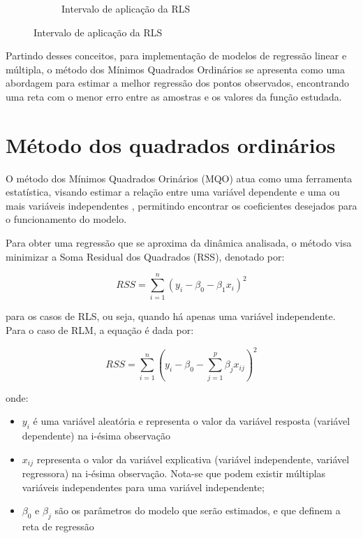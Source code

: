 \begin{figure}[H]
\begin{subfigure}{0.4\textwidth}
		\caption{Intervalo de aplicação da RLS}
		\label{fig:intervalo_aplicacao_rls}
	\end{subfigure}
	\label{fig:comportamento_regressao_linear}
\end{figure}

Partindo desses conceitos, para implementação de modelos de regressão linear e múltipla, o método dos Mínimos Quadrados Ordinários se apresenta como uma abordagem para estimar a melhor regressão dos pontos observados, encontrando uma reta com o menor erro entre as amostras e os valores da função estudada.

\section{Método dos quadrados ordinários}

O método dos Mínimos Quadrados Orinários (MQO) atua como uma ferramenta estatística, visando estimar a relação entre uma variável dependente e uma ou mais variáveis independentes \cite{Alkama2020}, permitindo encontrar os coeficientes desejados para o funcionamento do modelo.

Para obter uma regressão que se aproxima da dinâmica analisada, o método visa minimizar a Soma Residual dos Quadrados (RSS), denotado por:

\begin{equation}
	RSS = \sum_{i=1}^{n} \left(y_i - \beta_0 - \beta_1x_{i}\right)^2
\end{equation}

para os casos de RLS, ou seja, quando há apenas uma variável independente. Para o caso de RLM, a equação é dada por:

\begin{equation}
    RSS = \sum_{i=1}^{n} \left(y_i - \beta_0 - \sum_{j=1}^{p}\beta_jx_{ij}\right)^2
\end{equation}

onde:

\begin{itemize}
    \item $y_i$ é uma variável aleatória e representa o valor da variável resposta (variável dependente) na i-ésima observação
    \item $x_{ij}$ representa o valor da variável explicativa (variável independente, variável regressora) na i-ésima observação. Nota-se que podem existir múltiplas variáveis independentes para uma variável independente; 
    \item $\beta_{0}$ e $\beta_{j}$ são os parâmetros do modelo que serão estimados, e que definem a reta de regressão
\end{itemize}

